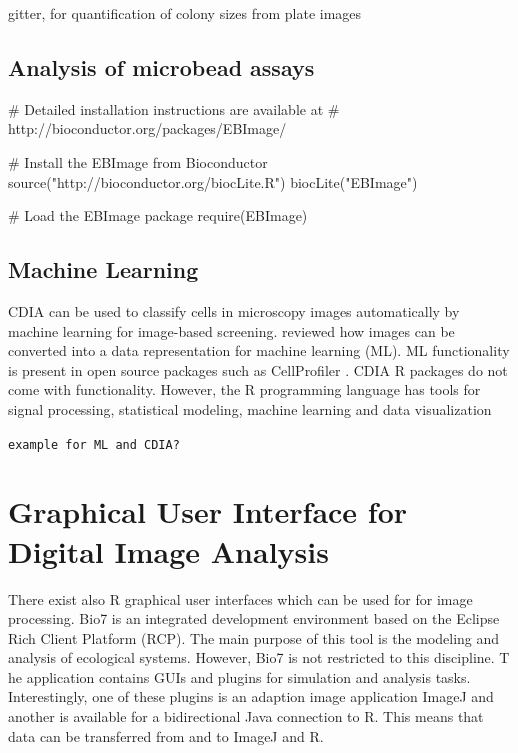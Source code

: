 gitter, for quantification of colony sizes from plate images \citep{wagih_gitter:_2014}


\subsection{Analysis of microbead assays}

\citep{rodiger_highly_2013, rodiger_nucleic_2014}

\begin{example}
# Detailed installation instructions are available at 
# http://bioconductor.org/packages/EBImage/

# Install the EBImage from Bioconductor
source("http://bioconductor.org/biocLite.R")
biocLite("EBImage")

# Load the EBImage package
require(EBImage)


\end{example}

\subsection{Machine Learning}
CDIA can be used to classify cells in microscopy images automatically by machine 
learning for image-based screening. \citet{sommer_machine_2013} reviewed how 
images can be converted into a data representation for machine learning (ML). ML 
functionality is present in open source packages such as CellProfiler 
\citep{conrad_micropilot:_2011, sommer_machine_2013}. CDIA R packages do not 
come with functionality. However, the R programming language has tools for 
signal processing, statistical modeling, machine learning and data visualization 
\citep{abbas_comparative_2014, fuchs_clustering_2010, pau_ebimager_2010}

\texttt{example for ML and CDIA?}

\section{Graphical User Interface for Digital Image Analysis}

There exist also R graphical user interfaces \citep{rodiger_rkward:_2012} which 
can be used for for image processing. Bio7 is an integrated development 
environment based on the Eclipse Rich Client Platform (RCP). The main purpose of 
this tool is the modeling and analysis of ecological systems. However, Bio7 is 
not restricted to this discipline. T he application contains GUIs and plugins 
for simulation and analysis tasks. Interestingly, one of these plugins is an 
adaption image application ImageJ and another is available for a bidirectional 
Java connection to R. This means that data can be transferred from and to ImageJ 
and R.

